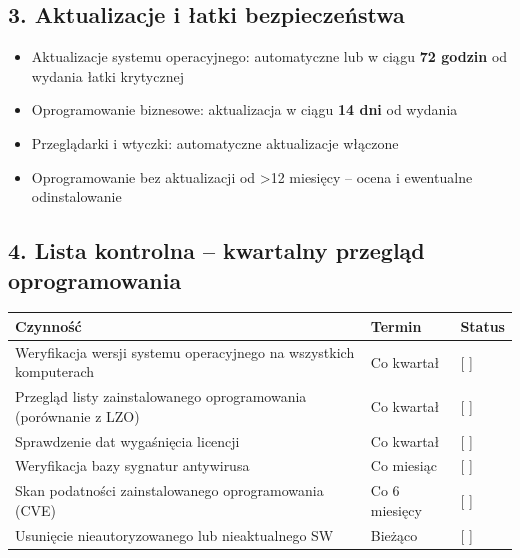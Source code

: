 \documentclass[12pt,a4paper]{article}
\providecommand{\tightlist}{\setlength{\itemsep}{0pt}\setlength{\parskip}{0pt}}
\begin{document}
\subsection{3. Aktualizacje i łatki
bezpieczeństwa}\label{aktualizacje-i-ux142atki-bezpieczeux144stwa}

\begin{itemize}
\tightlist
\item
  Aktualizacje systemu operacyjnego: automatyczne lub w ciągu \textbf{72
  godzin} od wydania łatki krytycznej
\item
  Oprogramowanie biznesowe: aktualizacja w ciągu \textbf{14 dni} od
  wydania
\item
  Przeglądarki i wtyczki: automatyczne aktualizacje włączone
\item
  Oprogramowanie bez aktualizacji od \textgreater12 miesięcy -- ocena i
  ewentualne odinstalowanie
\end{itemize}

\subsection{4. Lista kontrolna -- kwartalny przegląd
oprogramowania}\label{lista-kontrolna-kwartalny-przeglux105d-oprogramowania}

\begin{longtable}[]{@{}>{\raggedright\arraybackslash}p{}>{\raggedright\arraybackslash}p{}>{\raggedright\arraybackslash}p{}@{}}
\toprule\noalign{}
Czynność & Termin & Status \\
\midrule\noalign{}
\endhead
\bottomrule\noalign{}
\endlastfoot
Weryfikacja wersji systemu operacyjnego na wszystkich komputerach & Co
kwartał & {[} {]} \underline{\hspace{2cm}} \\
Przegląd listy zainstalowanego oprogramowania (porównanie z LZO) & Co
kwartał & {[} {]} \underline{\hspace{2cm}} \\
Sprawdzenie dat wygaśnięcia licencji & Co kwartał & {[} {]}
\underline{\hspace{2cm}} \\
Weryfikacja bazy sygnatur antywirusa & Co miesiąc & {[} {]}
\underline{\hspace{2cm}} \\
Skan podatności zainstalowanego oprogramowania (CVE) & Co 6 miesięcy &
{[} {]} \underline{\hspace{2cm}} \\
Usunięcie nieautoryzowanego lub nieaktualnego SW & Bieżąco & {[} {]}
\underline{\hspace{2cm}} \\
\end{longtable}
\end{document}
